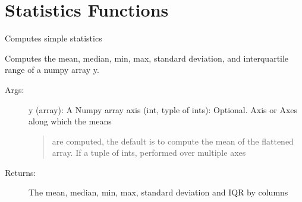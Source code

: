 \documentclass[letterpaper,10pt,english]{sphinxmanual}
\begin{document}
\chapter{Statistics Functions}
\label{\detokenize{Stats::doc}}\label{\detokenize{Stats:statistics-functions}}

\begin{fulllineitems}
\label{\detokenize{Stats:pyleoclim.Stats.simpleStats}}
Computes simple statistics

Computes the mean, median, min, max, standard deviation, and interquartile
range of a numpy array y.
\begin{description}
\item[{Args:}] \leavevmode
y (array): A Numpy array
axis (int, typle of ints): Optional. Axis or Axes along which the means
\begin{quote}

are computed, the default is to compute the mean of the flattened
array. If a tuple of ints, performed over multiple axes
\end{quote}

\item[{Returns:}] \leavevmode
The mean, median, min, max, standard deviation and IQR by columns

\end{description}

\end{fulllineitems}

\end{document}
